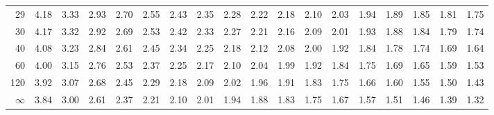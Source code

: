 \begin{mvtable}
{{\begin{tabular}{r|*{17}{r}}
29 & 4.18 & 3.33 & 2.93 & 2.70 & 2.55 & 2.43 & 2.35 & 2.28 & 2.22 & 2.18 & 2.10 & 2.03 & 1.94 & 1.89 & 1.85 & 1.81 & 1.75\\
30 & 4.17 & 3.32 & 2.92 & 2.69 & 2.53 & 2.42 & 2.33 & 2.27 & 2.21 & 2.16 & 2.09 & 2.01 & 1.93 & 1.88 & 1.84 & 1.79 & 1.74\\
40 & 4.08 & 3.23 & 2.84 & 2.61 & 2.45 & 2.34 & 2.25 & 2.18 & 2.12 & 2.08 & 2.00 & 1.92 & 1.84 & 1.78 & 1.74 & 1.69 & 1.64\\
60 & 4.00 & 3.15 & 2.76 & 2.53 & 2.37 & 2.25 & 2.17 & 2.10 & 2.04 & 1.99 & 1.92 & 1.84 & 1.75 & 1.69 & 1.65 & 1.59 & 1.53\\
120 & 3.92 & 3.07 & 2.68 & 2.45 & 2.29 & 2.18 & 2.09 & 2.02 & 1.96 & 1.91 & 1.83 & 1.75 & 1.66 & 1.60 & 1.55 & 1.50 & 1.43\\
$\infty$ & 3.84 & 3.00 & 2.61 & 2.37 & 2.21 & 2.10 & 2.01 & 1.94 & 1.88 & 1.83 & 1.75 & 1.67 & 1.57 & 1.51 & 1.46 & 1.39 & 1.32\\
\bottomrule
\end{tabular}
}}
\end{mvtable}
